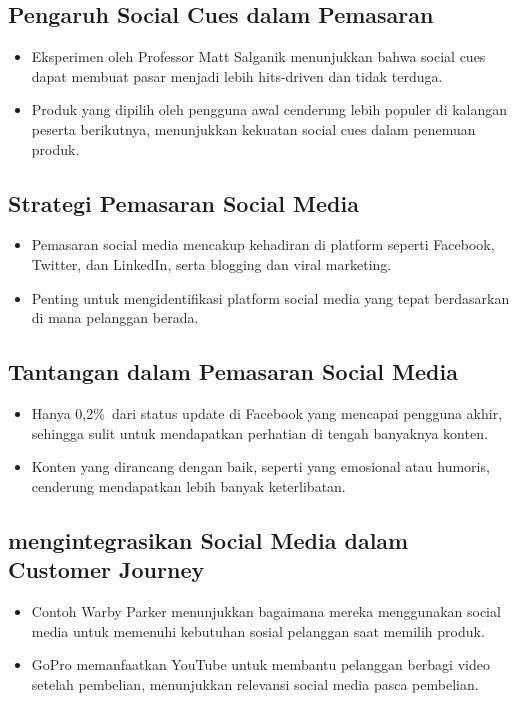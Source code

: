\documentclass{article}
\begin{document}
\subsection{Pengaruh Social Cues dalam Pemasaran}
\begin{itemize}
    \item Eksperimen oleh Professor Matt Salganik menunjukkan bahwa social cues dapat membuat pasar menjadi lebih hits-driven dan tidak terduga.
    \item Produk yang dipilih oleh pengguna awal cenderung lebih populer di kalangan peserta berikutnya, menunjukkan kekuatan social cues dalam penemuan produk.
\end{itemize}

\subsection{Strategi Pemasaran Social Media}
\begin{itemize}
    \item Pemasaran social media mencakup kehadiran di platform seperti Facebook, Twitter, dan LinkedIn, serta blogging dan viral marketing.
    \item Penting untuk mengidentifikasi platform social media yang tepat berdasarkan di mana pelanggan berada.
\end{itemize}

\subsection{Tantangan dalam Pemasaran Social Media}
\begin{itemize}
    \item Hanya 0,2\%\ dari status update di Facebook yang mencapai pengguna akhir, sehingga sulit untuk mendapatkan perhatian di tengah banyaknya konten.
    \item Konten yang dirancang dengan baik, seperti yang emosional atau humoris, cenderung mendapatkan lebih banyak keterlibatan.
\end{itemize}

\subsection{mengintegrasikan Social Media dalam Customer Journey}
\begin{itemize}
    \item Contoh Warby Parker menunjukkan bagaimana mereka menggunakan social media untuk memenuhi kebutuhan sosial pelanggan saat memilih produk.
    \item GoPro memanfaatkan YouTube untuk membantu pelanggan berbagi video setelah pembelian, menunjukkan relevansi social media pasca pembelian.
\end{itemize}
\end{document}
